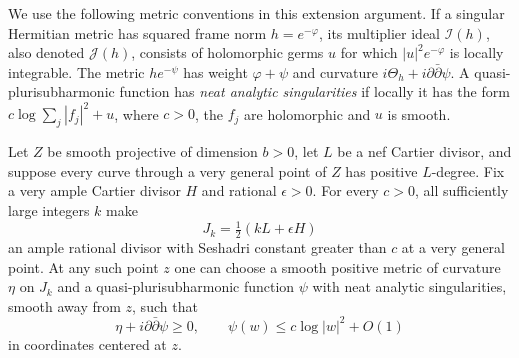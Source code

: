 We use the following metric conventions in this extension argument.
If a singular Hermitian metric has squared frame norm $h=e^{-\varphi}$,
its multiplier ideal $\mathcal I(h)$, also denoted $\mathcal J(h)$,
consists of holomorphic germs $u$ for which $|u|^2e^{-\varphi}$ is
locally integrable. The metric $he^{-\psi}$ has weight
$\varphi+\psi$ and curvature $i\Theta_h+i\partial\bar\partial\psi$.
A quasi-plurisubharmonic function has \emph{neat analytic singularities}
if locally it has the form $c\log\sum_j|f_j|^2+u$, where $c>0$,
the $f_j$ are holomorphic and $u$ is smooth.

\begin{lemma}
\label{V:sesha}
Let $Z$ be smooth projective of dimension $b>0$, let $L$ be a nef
Cartier divisor, and suppose every curve through a very general point
of $Z$ has positive $L$-degree.  Fix a very ample Cartier divisor $H$
and rational $\epsilon>0$.  For every $c>0$, all sufficiently large
integers $k$ make
\[
 J_k=\tfrac12(kL+\epsilon H)
\]
an ample rational divisor with Seshadri constant greater than $c$ at
a very general point.  At any such point $z$ one can choose a smooth
positive metric of curvature $\eta$ on $J_k$ and a quasi-plurisubharmonic
function $\psi$ with neat analytic singularities, smooth away from $z$,
such that
\[
 \eta+i\partial\bar\partial\psi\ge0,
 \qquad \psi(w)\le c\log|w|^2+O(1)
\]
in coordinates centered at $z$.
\end{lemma}

